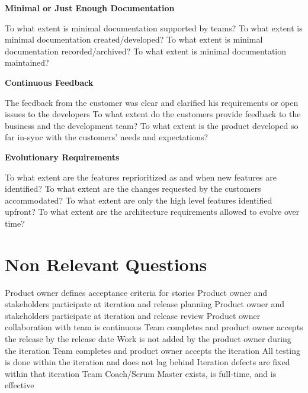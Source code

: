 \textbf{Minimal or Just Enough Documentation}
\begin{itemize}
	\ops To what extent is minimal documentation supported by teams? 
	\ops To what extent is minimal documentation created/developed? 
	\ops To what extent is minimal documentation recorded/archived? 
	\ops To what extent is minimal documentation maintained? 
\end{itemize}

\textbf{Continuous Feedback}
\begin{itemize}
	\pamr The feedback from the customer was clear and clarified his requirements or open issues to the developers %
	\ops To what extent do the customers provide feedback to the business and the development team? 
	\ops To what extent is the product developed so far in-sync with the customers' needs and expectations?
\end{itemize}

\textbf{Evolutionary Requirements}
\begin{itemize}
	\ops To what extent are the features reprioritized as and when new features are identified?
	\ops To what extent are the changes requested by the customers accommodated? 
	\ops To what extent are only the high level features identified upfront?
	\ops To what extent are the architecture requirements allowed to evolve over time?
\end{itemize}

\section{Non Relevant Questions}

\begin{itemize}
	\taanr Product owner defines acceptance criteria for stories 
	\taanr Product owner and stakeholders participate at iteration and release planning 
	\taanr Product owner and stakeholders participate at iteration and release review 
	\taanr Product owner collaboration with team is continuous  
	\taanr Team completes and product owner accepts the release by the release date	 
	\taanr Work is not added by the product owner during the iteration 
	\taanr Team completes and product owner accepts the iteration  	 
	\taanr All testing is done within the iteration and does not lag behind 
	\taanr Iteration defects are fixed within that iteration 
	\taanr Team Coach/Scrum Master exists, is full-time, and is effective
\end{itemize}
